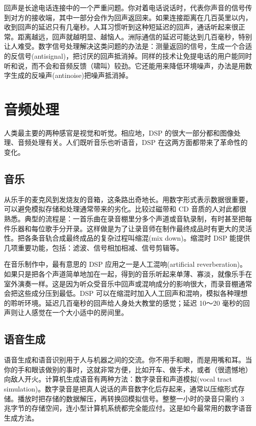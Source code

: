 回声是长途电话连接中的一个严重问题。你对着电话说话时，代表你声音的信号传到对方的接收端，其中一部分会作为回声返回来。如果连接距离在几百英里以内，收到回声的延迟只有几毫秒。人耳习惯听到这种短延迟的回声，通话听起来很正常。距离越远，回声就越明显、越恼人。洲际通信的延迟可能达到几百毫秒，特别让人难受。数字信号处理解决这类问题的办法是：测量返回的信号，生成一个合适的反信号(antisignal)，把讨厌的回声抵消掉。同样的技术让免提电话的用户能同时听和说，而不会和音频反馈（啸叫）较劲。它还能用来降低环境噪声，办法是用数字生成的反噪声(antinoise)把噪声抵消掉。

\section{音频处理}

人类最主要的两种感官是视觉和听觉。相应地，DSP
的很大一部分都和图像处理、音频处理有关。人们既听音乐也听语音，DSP
在这两方面都带来了革命性的变化。

\subsection{音乐}

从乐手的麦克风到发烧友的音箱，这条路出奇地长。用数字形式表示数据很重要，可以避免模拟存储和处理通常带来的劣化。比较过磁带和
CD
音质的人对此都很熟悉。典型的流程是：一首乐曲在录音棚里分多个声道或音轨录制，有时甚至把每件乐器和每位歌手分开录。这样做是为了让录音师在制作最终成品时有更大的灵活性。把各条音轨合成最终成品的复杂过程叫缩混(mix
down)。缩混时 DSP
能提供几项重要功能，包括：滤波、信号相加相减、信号剪辑等。

在音乐制作中，最有意思的 DSP 应用之一是人工混响(artificial
reverberation)。如果只是把各个声道简单地加在一起，得到的音乐听起来单薄、寡淡，就像乐手在室外演奏一样。这是因为听众受音乐中回声或混响成分的影响很大，而录音棚通常会把这些成分压到最低。DSP
可以在缩混时加入人工回声和混响，模拟各种理想的聆听环境。延迟几百毫秒的回声给人身处大教堂的感觉；延迟
10～20 毫秒的回声则让人感觉在一个大小适中的房间里。

\subsection{语音生成}

语音生成和语音识别用于人与机器之间的交流。你不用手和眼，而是用嘴和耳。当你的手和眼该做别的事时，这就非常方便，比如开车、做手术，或者（很遗憾地）向敌人开火。计算机生成语音有两种方法：数字录音和声道模拟(vocal
tract
simulation)。数字录音是把真人说话的声音数字化后存起来，通常以压缩形式存储。播放时把存储的数据解压，再转换回模拟信号。整整一小时的录音只需约
3
兆字节的存储空间，连小型计算机系统都完全能应付。这是如今最常用的数字语音生成方法。

